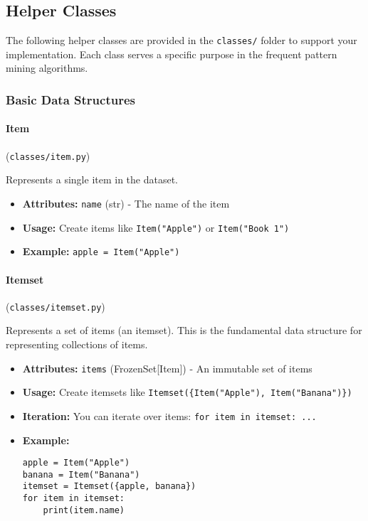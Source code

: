 \documentclass[
english,
smallborders
]{i6prcsht}
\begin{document}
\vspace*{1cm}

\subsection*{Helper Classes}

The following helper classes are provided in the \texttt{classes/} folder to support your implementation. Each class serves a specific purpose in the frequent pattern mining algorithms.

\vspace*{0.5cm}

\subsubsection*{Basic Data Structures}

\paragraph{Item} (\texttt{classes/item.py})

Represents a single item in the dataset.

\begin{itemize}
	\item \textbf{Attributes:} \texttt{name} (str) - The name of the item
	\item \textbf{Usage:} Create items like \texttt{Item("Apple")} or \texttt{Item("Book 1")}
	\item \textbf{Example:} \texttt{apple = Item("Apple")}
\end{itemize}

\vspace*{0.3cm}

\paragraph{Itemset} (\texttt{classes/itemset.py})

Represents a set of items (an itemset). This is the fundamental data structure for representing collections of items.

\begin{itemize}
	\item \textbf{Attributes:} \texttt{items} (FrozenSet[Item]) - An immutable set of items
	\item \textbf{Usage:} Create itemsets like \texttt{Itemset(\{Item("Apple"), Item("Banana")\})}
	\item \textbf{Iteration:} You can iterate over items: \texttt{for item in itemset: ...}
	\item \textbf{Example:}
	      \begin{lstlisting}
apple = Item("Apple")
banana = Item("Banana")
itemset = Itemset({apple, banana})
for item in itemset:
    print(item.name)
    \end{lstlisting}
\end{itemize}
\end{document}
